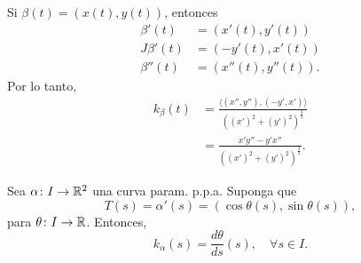\begin{note}
	Si $\beta(t) = (x(t), y(t))$, entonces
	\begin{align*}
		\beta'(t) &= (x'(t), y'(t)) \\
		J \beta'(t) &= (-y'(t), x'(t)) \\
		\beta''(t) &= (x''(t), y''(t))
	.\end{align*}
	Por lo tanto,
	\begin{align*}
		k_{\beta}(t) &= \frac{\langle (x'',y''), (-y',x') \rangle}{((x')^{2} + (y')^{2})^{\frac{3}{2}}} \\
		&= \frac{x' y'' - y' x''}{((x')^{2} + (y')^{2})^{\frac{3}{2}}}
	.\end{align*}
\end{note}

\begin{prop}
	Sea $\alpha \colon I \to \mathbb{R}^{2}$ una curva param. p.p.a. Suponga que
	\[ T(s) = \alpha'(s) = (\cos \theta(s), \sin \theta(s)), \]
	para $\theta \colon I \to \mathbb{R}$. Entonces,
	\[ k_{\alpha}(s) = \frac{d\theta}{ds}(s), \quad \forall s \in I. \]
\end{prop}
